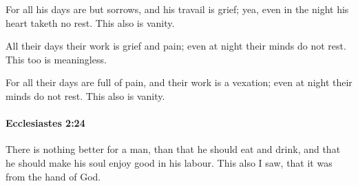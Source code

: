 			\begin{versebox}
					\item[BHS] 
					\item[LXX] 
					\item[ASV] For all his days are but sorrows, and his travail is grief; yea, even in the night his heart taketh no rest. This also is vanity.
					\item[NIV] All their days their work is grief and pain; even at night their minds do not rest. This too is meaningless.
					\item[NRSV] For all their days are full of pain, and their work is a vexation; even at night their minds do not rest. This also is vanity.
			\end{versebox}

		\paragraph{Ecclesiastes 2:24} %
			\label{ECCLESIASTES-2-24}

			There is nothing better for a man, than that he should eat and drink, and that he should make his soul enjoy good in his labour. This also I saw, that it was from the hand of God.

